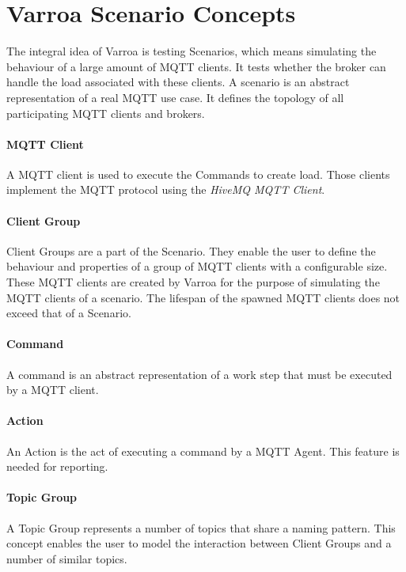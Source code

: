 \section{Varroa Scenario Concepts}
The integral idea of Varroa is testing Scenarios, which means simulating the behaviour of a large amount of MQTT clients.
It tests whether the broker can handle the load associated with these clients.
A scenario is an abstract representation of a real MQTT use case.
It defines the topology of all participating MQTT clients and brokers.

\paragraph{MQTT Client}
A MQTT client is used to execute the Commands to create load.
Those clients implement the MQTT protocol using the \emph{HiveMQ MQTT Client}.

\paragraph{Client Group}
Client Groups are a part of the Scenario.
They enable the user to define the behaviour and properties of a group of MQTT clients with a configurable size.
These MQTT clients are created by Varroa for the purpose of simulating the MQTT clients of a scenario.
The lifespan of the spawned MQTT clients does not exceed that of a Scenario.

\paragraph{Command}
A command is an abstract representation of a work step that must be executed by a MQTT client.

\paragraph{Action}
An Action is the act of executing a command by a MQTT Agent.
This feature is needed for reporting.

\paragraph{Topic Group}
A Topic Group represents a number of topics that share a naming pattern.
This concept enables the user to model the interaction between Client Groups and a number of similar topics.

